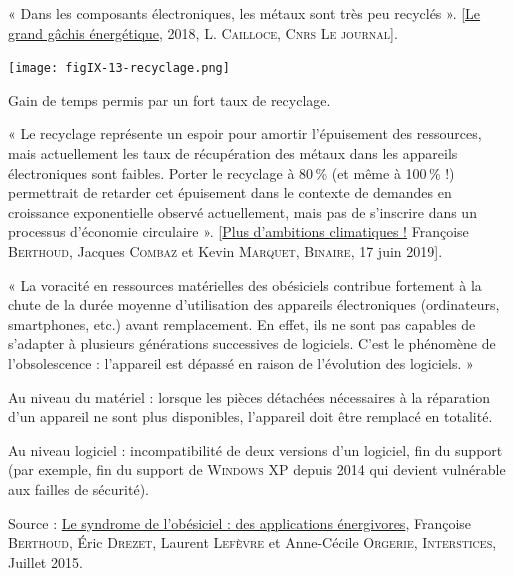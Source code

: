 
« Dans les composants électroniques, les métaux sont très peu recyclés ». [\href{https://lejournal.cnrs.fr/articles/numerique-le-grand-gachis-energetique}{Le grand gâchis énergétique}, 2018, L. \textsc{Cailloce}, \textsc{Cnrs Le journal}].

\begin{marginfigure}
\texttt{[image: figIX-13-recyclage.png]}
\caption{\label{fig:IX.13}Gain de temps permis par un fort taux de recyclage.}
\end{marginfigure}

« Le recyclage représente un espoir pour amortir l’épuisement des ressources, mais actuellement les taux de récupération des métaux dans les appareils électroniques sont faibles. Porter le recyclage à 80\,\% (et même à 100\,\% !) permettrait de retarder cet épuisement dans le contexte de demandes en croissance exponentielle observé actuellement, mais pas de s’inscrire dans un processus d’économie circulaire ». [\href{https://www.lemonde.fr/blog/binaire/2019/06/17/plus-d-ambitions-climatiques/}{Plus d’ambitions climatiques !} Françoise \textsc{Berthoud}, Jacques \textsc{Combaz} et Kevin \textsc{Marquet}, \textsc{Binaire}, 17 juin 2019].


« La voracité en ressources matérielles des obésiciels contribue fortement à la chute de la durée moyenne d’utilisation des appareils électroniques (ordinateurs, smartphones, etc.) avant remplacement. En effet, ils ne sont pas capables de s’adapter à plusieurs générations successives de logiciels. C’est le phénomène de l’obsolescence : l’appareil est dépassé en raison de l’évolution des logiciels. »

\begin{jazzitemize}
\item Au niveau du matériel : lorsque les pièces détachées nécessaires à la réparation d’un appareil ne sont plus disponibles, l’appareil doit être remplacé en totalité.
\item Au niveau logiciel : incompatibilité de deux versions d’un logiciel, fin du support (par exemple, fin du support de \textsc{Windows XP} depuis 2014 qui devient vulnérable aux failles de sécurité).
\end{jazzitemize}

\noindent Source : \href{https://interstices.info/le-syndrome-de-lobesiciel-des-applications-energivores/}{Le syndrome de l’obésiciel : des applications énergivores}, Françoise \textsc{Berthoud}, Éric \textsc{Drezet}, Laurent \textsc{Lefèvre} et Anne-Cécile \textsc{Orgerie}, \textsc{Interstices}, Juillet 2015.

